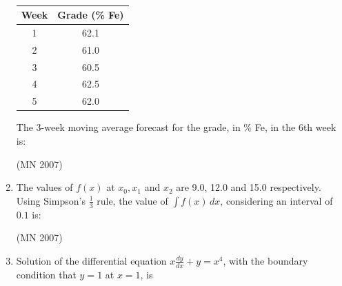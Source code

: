 \begin{enumerate}[label=\thesubsection.\arabic*,ref=\thesubsection.\theenumi]
\begin{table}[H]
    \centering\normalsize
\begin{tabular}{|c|c|}
\hline
Week & Grade (\% Fe) \\
\hline
1 & 62.1 \\
\hline
2 & 61.0 \\
\hline
3 & 60.5 \\
\hline
4 & 62.5 \\
\hline
5 & 62.0 \\
\hline
\end{tabular}
   \caption{}
    \label{tab:Q57}
\end{table}
The 3-week moving average forecast for the grade, in \% Fe, in the 6th week is:

\hfill (MN 2007)
\begin{enumerate}
\end{enumerate}
\item The values of $f(x)$ at $x_0, x_1$ and $x_2$ are 9.0, 12.0 and 15.0 respectively. Using Simpson's $\frac{1}{3}$ rule, the value of $\int f(x) \, dx$, considering an interval of $0.1$ is:

	\hfill (MN 2007)
\begin{enumerate}
\end{enumerate}
\item Solution of the differential equation $x\frac{dy}{dx} + y = x^4$, with the boundary condition that $y=1$ at $x=1$, is
\hfill{}
\begin{enumerate}
\end{enumerate}


\end{enumerate}
